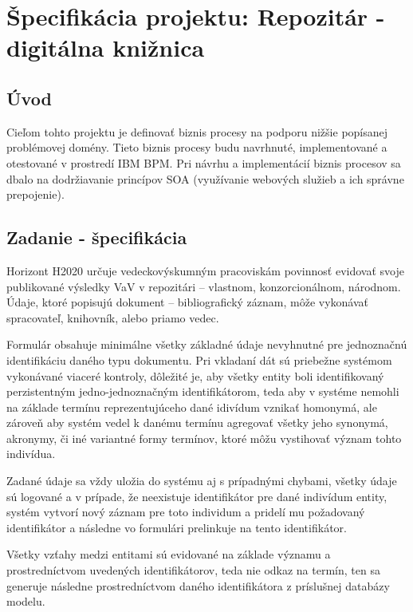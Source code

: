 \documentclass[10pt,oneside,slovak,a4paper]{article}
\begin{document}
\newpage

\section{Špecifikácia projektu: Repozitár - digitálna knižnica}

\subsection{Úvod}

Cieľom tohto projektu je definovať biznis procesy na podporu nižšie popísanej problémovej domény. Tieto biznis procesy budu navrhnuté, implementované a otestované v prostredí IBM BPM. Pri návrhu a implementácií biznis procesov sa dbalo na dodržiavanie princípov SOA (využívanie webových služieb a ich správne prepojenie).


\subsection{Zadanie - špecifikácia}

Horizont H2020 určuje vedeckovýskumným pracoviskám povinnosť evidovať svoje publikované výsledky VaV v repozitári – vlastnom, konzorcionálnom, národnom. Údaje, ktoré popisujú dokument – bibliografický záznam, môže vykonávať spracovateľ, knihovník, alebo priamo vedec.

Formulár obsahuje minimálne všetky základné údaje nevyhnutné pre jednoznačnú identifikáciu daného typu dokumentu. Pri vkladaní dát sú priebežne systémom vykonávané viaceré kontroly, dôležité je, aby všetky entity boli identifikovaný perzistentným jedno-jednoznačným identifikátorom, teda aby v systéme nemohli na základe termínu reprezentujúceho dané idivídum vznikať homonymá, ale zároveň aby systém vedel k danému termínu agregovať všetky jeho synonymá, akronymy, či iné variantné formy termínov, ktoré môžu vystihovať význam tohto indivídua.

Zadané údaje sa vždy uložia do systému aj s prípadnými chybami, všetky údaje sú logované a v prípade, že neexistuje identifikátor pre dané indivídum entity, systém vytvorí nový záznam pre toto individum a pridelí mu požadovaný identifikátor a následne vo formulári prelinkuje na tento identifikátor.

Všetky vzťahy medzi entitami sú evidované na základe významu a prostredníctvom uvedených identifikátorov, teda nie odkaz na termín, ten sa generuje následne prostredníctvom daného identifikátora z príslušnej databázy modelu. 
\end{document}
